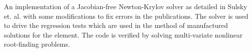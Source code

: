 An implementation of a Jacobian-free Newton-Krylov solver as detailed in Sulsky et. al. with some modifications to fix errors in the publications. The solver is used to drive the regression tests which are used in the method of manufactured solutions for the element. The code is verified by solving multi-variate nonlinear root-finding problems.
